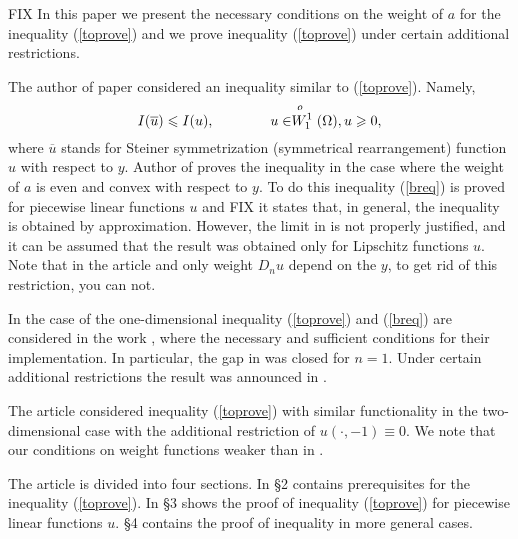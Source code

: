 FIX In this paper we present the necessary conditions on the weight of $a$ for the inequality (\ref{toprove})
and we prove inequality (\ref{toprove}) under certain additional restrictions.

The author of paper \cite{Br} considered an inequality similar to (\ref{toprove}).
Namely,
\begin{equation}
\label{breq}
I( \overline{u} ) \le I( u ), \qquad \qquad u \in \Wf( \Omega ), u \ge 0,
\end{equation}
where $\overline{u}$ stands for Steiner symmetrization (symmetrical rearrangement) function $u$ with respect to $y$.
Author of \cite{Br} proves the inequality in the case where the weight of $a$ is even and convex with respect to $y$.
To do this inequality (\ref{breq}) is proved for piecewise linear functions $u$
and FIX it states that, in general, the inequality is obtained by approximation.
However, the limit in \cite{Br} is not properly justified,
and it can be assumed that the result was obtained only for Lipschitz functions $u$.
Note that in the article \cite{Br} and only weight $D_n u$ depend on the $y$, to get rid of this restriction, you can not.

In the case of the one-dimensional inequality (\ref{toprove}) and (\ref{breq}) are considered in the work \cite{1dim},
where the necessary and sufficient conditions for their implementation.
In particular, the gap in \cite{Br} was closed for $n = 1$.
Under certain additional restrictions the result was announced in \cite{DAN}.

The article \cite{Lan} considered inequality (\ref{toprove}) with similar functionality in the two-dimensional case
with the additional restriction of $u(\cdot, -1) \equiv 0$.
We note that our conditions on weight functions weaker than in \cite{Lan}.

The article is divided into four sections.
In \S2 contains prerequisites for the inequality (\ref{toprove}).
In \S3 shows the proof of inequality (\ref{toprove}) for piecewise linear functions $u$.
\S4 contains the proof of inequality in more general cases.